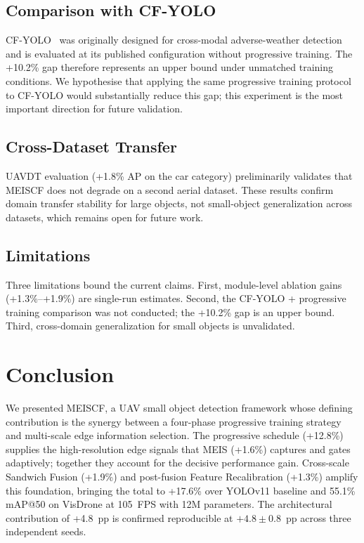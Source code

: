 \documentclass[preprint,12pt]{elsarticle}
\begin{document}
\subsection{Comparison with CF-YOLO}

CF-YOLO~\cite{cf-yolo} was originally designed for cross-modal adverse-weather
detection and is evaluated at its published configuration without progressive
training. The +10.2\% gap therefore represents an upper bound under unmatched
training conditions. We hypothesise that applying the same progressive training
protocol to CF-YOLO would substantially reduce this gap; this experiment is the
most important direction for future validation.

\subsection{Cross-Dataset Transfer}

UAVDT evaluation (+1.8\% AP on the car category) preliminarily validates that
MEISCF does not degrade on a second aerial dataset. These results confirm domain
transfer stability for large objects, not small-object generalization across
datasets, which remains open for future work.

\subsection{Limitations}

Three limitations bound the current claims. First, module-level ablation gains
(+1.3\%--+1.9\%) are single-run estimates. Second, the CF-YOLO + progressive
training comparison was not conducted; the +10.2\% gap is an upper bound. Third,
cross-domain generalization for small objects is unvalidated.



\section{Conclusion}
\label{sec:conclusion}

We presented MEISCF, a UAV small object detection framework whose defining
contribution is the synergy between a four-phase progressive training strategy and
multi-scale edge information selection. The progressive schedule (+12.8\%) supplies
the high-resolution edge signals that MEIS (+1.6\%) captures and gates adaptively;
together they account for the decisive performance gain. Cross-scale Sandwich
Fusion (+1.9\%) and post-fusion Feature Recalibration (+1.3\%) amplify this
foundation, bringing the total to +17.6\% over YOLOv11 baseline and 55.1\%
mAP@50 on VisDrone at 105~FPS with 12M parameters. The architectural contribution
of +4.8~pp is confirmed reproducible at $+4.8\pm0.8$~pp across three independent
seeds.
\end{document}
